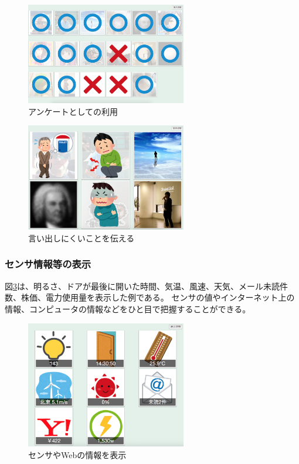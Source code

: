 \begin{figure}[h]
\centering
\includegraphics[width=7cm]{images/vote.eps}
\caption{アンケートとしての利用}
\label{vote}
\end{figure}

\begin{figure}[h]
\centering
\includegraphics[width=7cm]{images/rescue.eps}
\caption{言い出しにくいことを伝える}
\label{rescue}
\end{figure}

\subsubsection{センサ情報等の表示}

図\ref{sensors}は、明るさ、ドアが最後に開いた時間、気温、風速、天気、メール未読件数、株価、電力使用量を表示した例である。
センサの値やインターネット上の情報、コンピュータの情報などをひと目で把握することができる。

\begin{figure}[h]
\centering
\includegraphics[width=7cm]{images/sensors.eps}
\caption{センサやWebの情報を表示}
\label{sensors}
\end{figure}

